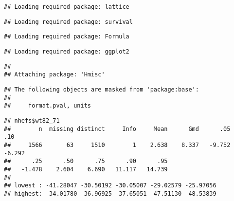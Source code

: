 \documentclass[10pt,]{book}
\newenvironment{Shaded}{\begin{snugshade}}{\end{snugshade}}
\newcommand{\DecValTok}[1]{\textcolor[rgb]{0.00,0.00,0.81}{#1}}
\newcommand{\KeywordTok}[1]{\textcolor[rgb]{0.13,0.29,0.53}{\textbf{#1}}}
\newcommand{\NormalTok}[1]{#1}
\newcommand{\OperatorTok}[1]{\textcolor[rgb]{0.81,0.36,0.00}{\textbf{#1}}}
\begin{document}
\begin{verbatim}
## Loading required package: lattice
\end{verbatim}

\begin{verbatim}
## Loading required package: survival
\end{verbatim}

\begin{verbatim}
## Loading required package: Formula
\end{verbatim}

\begin{verbatim}
## Loading required package: ggplot2
\end{verbatim}

\begin{verbatim}
## 
## Attaching package: 'Hmisc'
\end{verbatim}

\begin{verbatim}
## The following objects are masked from 'package:base':
## 
##     format.pval, units
\end{verbatim}

\begin{Shaded}
\end{Shaded}

\begin{verbatim}
## nhefs$wt82_71 
##        n  missing distinct     Info     Mean      Gmd      .05      .10 
##     1566       63     1510        1    2.638    8.337   -9.752   -6.292 
##      .25      .50      .75      .90      .95 
##   -1.478    2.604    6.690   11.117   14.739 
## 
## lowest : -41.28047 -30.50192 -30.05007 -29.02579 -25.97056
## highest:  34.01780  36.96925  37.65051  47.51130  48.53839
\end{verbatim}
\end{document}
